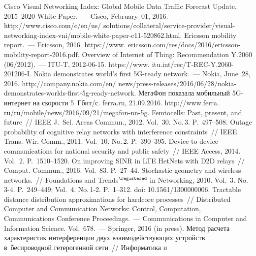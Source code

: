 \begin{multicols}{2}
{\small\frenchspacing
 {%
 \begin{thebibliography}{99}
Cisco Visual Networking Index: Global Mobile Data Traffic Forecast Update, 2015--2020 White 
Paper.~--- Cisco, February~01, 2016. {\sf  
http://www.cisco.com/c/en/us/ solutions/collateral/service-provider/visual-networking-index-vni/mobile-white-paper-c11-520862.html}.
Ericsson mobility report.~--- Ericsson, 2016. {\sf  
https://www. ericsson.com/res/docs/2016/ericsson-mobility-report-2016.pdf}.
Overview of Internet of Thing: Recommendation Y.2060 (06/2012).~--- ITU-T, 2012-06-15. {\sf 
https://www. itu.int/rec/T-REC-Y.2060-201206-I}.
Nokia demonstrates world's first 5G-ready network.~--- Nokia, June~28, 2016. {\sf  
http://company.nokia.com/en/ news/press-releases/2016/06/28/nokia-demonstrates-worlds-first-5g-ready-network}.
МегаФон показала мобильный 5G-интернет на скорости 5~Гбит/с. {\sf ferra.ru}, 
21.09.2016. {\sf http://www.ferra. ru/ru/mobile/news/2016/09/21/megafon-nn-5g}.
 Femtocells: Past, present, and future~// 
IEEE J.~Sel. Areas Commun., 2012. Vol.~30. No.\,3. P.~497--508.
 Outage probability of cognitive relay networks 
with interference constraints~// IEEE Trans. Wir. Comm., 2011. Vol.~10. No.\,2. P.~390--395.
 Device-to-device 
communications for national security and public safety~// IEEE Access, 2014. Vol.~2.  
P.~1510--1520.
 On improving SINR in LTE HetNets 
with D2D relays~// Comput. Commun., 2016. Vol.~83. P.~27--44.
 Stochastic geometry and wireless 
networks.~// Foundations and Trends$^\registered$ in Networking, 2010. Vol.~3. No.\,3-4. 
P.~249--449; Vol.~4. No.\,1-2. P.~1--312. doi: 10.1561/1300000006.
 Tractable distance distribution 
approximations for hardcore processes~// Distributed Computer and Communication Networks: 
Control, Computation, Communications Conference Proceedings.~--- 
Communications in Computer and Information Science. Vol.~678.~--- Springer, 2016 (in 
press).
 Метод расчета характеристик интерференции 
двух взаимодействующих устройств в~беспроводной гетерогенной сети~// Информатика и~

\end{thebibliography}}}
\end{multicols}

